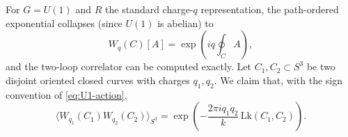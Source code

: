 \begin{example}\label{ex:abelian-wilson}
For $G = U(1)$ and $R$ the standard charge-$q$ representation, the path-ordered exponential collapses (since $U(1)$ is abelian) to
\begin{equation*}
W_q(C)[A] = \exp\left(iq\oint_C A\right),
\end{equation*}
and the two-loop correlator can be computed exactly. Let $C_1,C_2\subset S^3$ be two disjoint oriented closed curves with charges $q_1,q_2$. We claim that, with the sign convention of \eqref{eq:U1-action},
\begin{equation*}
\langle W_{q_1}(C_1)W_{q_2}(C_2)\rangle_{S^3}
=
\exp\left(-\frac{2\pi i q_1 q_2}{k}\,\mathrm{Lk}(C_1,C_2)\right).
\end{equation*}


\end{example}
